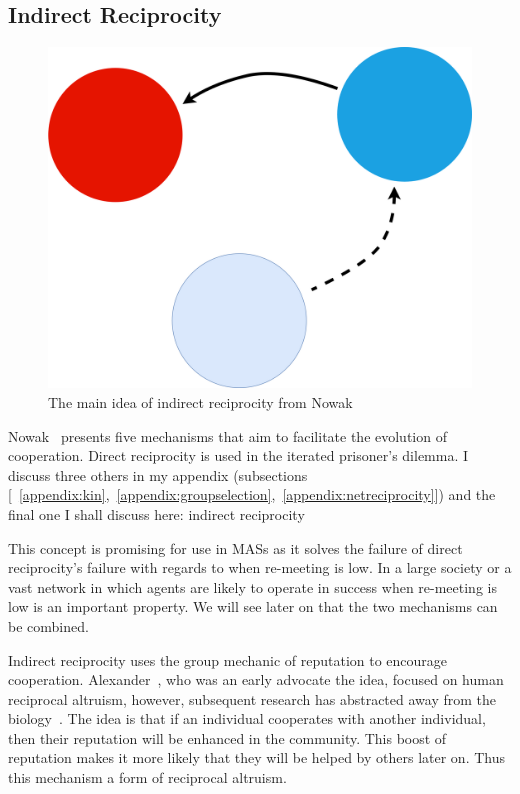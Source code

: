 \documentclass[]{final_report}
\begin{document}
\subsection{Indirect Reciprocity}
\label{sec:indir}
\begin{figure}
\vspace{-20pt}
\begin{framed}
	\center
	\includegraphics[width=\textwidth]{IndirectRec.png}
	\caption{The main idea of indirect reciprocity from Nowak~\cite{five_rules_coop}}
	\label{fig:indir_rec}
\end{framed}
\vspace{-20pt}
\end{figure}
Nowak~\cite{five_rules_coop} presents five mechanisms that aim to facilitate the evolution of cooperation. Direct reciprocity is used in the iterated prisoner's dilemma. I discuss three others in my appendix (subsections [~\ref{appendix:kin},~\ref{appendix:groupselection},~\ref{appendix:netreciprocity}]) and the final one I shall discuss here: indirect reciprocity\par
This concept is promising for use in MASs as it solves the failure of direct reciprocity's failure with regards to when re-meeting is low. In a large society or a vast network in which agents are likely to operate in success when re-meeting is low is an important property. We will see later on that the two mechanisms can be combined.\par
Indirect reciprocity uses the group mechanic of reputation to encourage cooperation. Alexander~\cite{alexander1987biology}, who was an early advocate the idea, focused on human reciprocal altruism, however, subsequent research has abstracted away from the biology~\cite{phelps_game_theoretic_analysis, imagevsstanding, evol_indirect_image, evoldirindir, five_rules_coop, leimarhammer, sugden2004economics, gossip_alt, mui2002computational}. The idea is that if an individual cooperates with another individual, then their reputation will be enhanced in the community. This boost of reputation makes it more likely that they will be helped by others later on. Thus this mechanism a form of reciprocal altruism.\par
\end{document}

